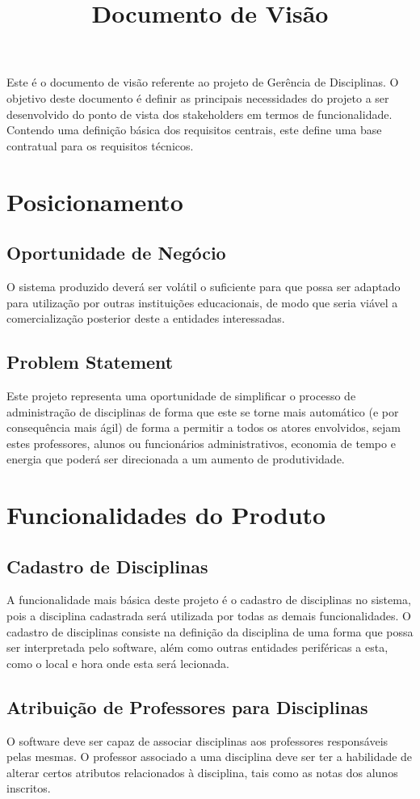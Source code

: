 \documentclass{article}
\title{Documento de Visão}
\begin{document}
\maketitle
Este é o documento de visão referente ao projeto de Gerência de Disciplinas. O objetivo deste documento é definir as principais necessidades do projeto a ser desenvolvido do ponto de vista dos stakeholders em termos de funcionalidade. Contendo uma definição básica dos requisitos centrais, este define uma base contratual para os requisitos técnicos.
\section{Posicionamento}
\subsection{Oportunidade de Negócio}
O sistema produzido deverá ser volátil o suficiente para que possa ser adaptado para utilização por outras instituições educacionais, de modo que seria viável a comercialização posterior deste a entidades interessadas.
\subsection{Problem Statement}
Este projeto representa uma oportunidade de simplificar o processo de administração de disciplinas de forma que este se torne mais automático (e por consequência mais ágil) de forma a permitir a todos os atores envolvidos, sejam estes professores, alunos ou funcionários administrativos, economia de tempo e energia que poderá ser direcionada a um aumento de produtividade.
\section{Funcionalidades do Produto}
\subsection{Cadastro de Disciplinas}
A funcionalidade mais básica deste projeto é o cadastro de disciplinas no sistema, pois a disciplina cadastrada será utilizada por todas as demais funcionalidades. O cadastro de disciplinas consiste na definição da disciplina de uma forma que possa ser interpretada pelo software, além como outras entidades periféricas a esta, como o local e hora onde esta será lecionada.
\subsection{Atribuição de Professores para Disciplinas}
O software deve ser capaz de associar disciplinas aos professores responsáveis pelas mesmas. O professor associado a uma disciplina deve ser ter a habilidade de alterar certos atributos relacionados à disciplina, tais como as notas dos alunos inscritos.
\end{document}
